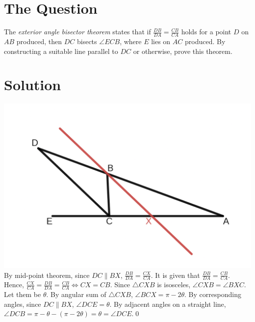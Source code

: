 \documentclass[a4paper]{article}
\begin{document}
\section*{The Question}
The \emph{exterior angle bisector theorem} states that if \(\frac{DB}{DA}=\frac{CB}{CA}\) holds for a point \(D\) on \(AB\) produced, then \(DC\) bisects \(\angle ECB\),
where \(E\) lies on \(AC\) produced. By constructing a suitable line parallel to \(DC\) or otherwise, prove this theorem.
\section*{Solution}
\includegraphics[width=\textwidth]{dreaded.png}
By mid-point theorem, since \(DC\parallel BX\), \(\frac{DB}{DA}=\frac{CX}{CA}\). It is given that \(\frac{DB}{DA}=\frac{CB}{CA}\). Hence, \(\frac{CX}{CA}=\frac{DB}{DA}=\frac{CB}{CA}\iff CX=CB\). Since \(\triangle CXB\) is isosceles, \(\angle CXB=\angle BXC\). Let them be \(\theta\). By angular sum of \(\triangle CXB\), \(\angle BCX=\pi-2\theta\).
By corresponding angles, since \(DC\parallel BX\), \(\angle DCE=\theta\). By adjacent angles on a straight line, \(\angle DCB=\pi-\theta-(\pi-2\theta)=\theta=\angle DCE\).\qed
\end{document}
